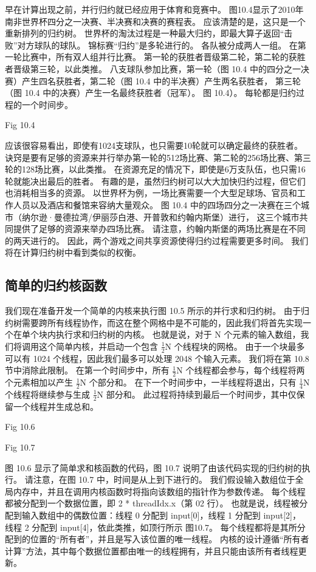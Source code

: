 \begin{remark}[体育和比赛并行约化]
早在计算出现之前，并行归约就已经应用于体育和竞赛中。 图10.4显示了2010年南非世界杯四分之一决赛、半决赛和决赛的赛程表。 
应该清楚的是，这只是一个重新排列的归约树。 世界杯的淘汰过程是一种最大归约，即最大算子返回“击败”对方球队的球队。 
锦标赛“归约”是多轮进行的。 各队被分成两人一组。 在第一轮比赛中，所有双人组并行比赛。 
第一轮的获胜者晋级第二轮，第二轮的获胜者晋级第三轮，以此类推。 
八支球队参加比赛，第一轮（图 10.4 中的四分之一决赛）产生四名获胜者，第二轮（图 10.4 中的半决赛）产生两名获胜者，
第三轮（图 10.4 中的决赛）产生一名最终获胜者（冠军）。 图 10.4）。 每轮都是归约过程的一个时间步。

{\color{red} Fig 10.4}

应该很容易看出，即使有1024支球队，也只需要10轮就可以确定最终的获胜者。 
诀窍是要有足够的资源来并行举办第一轮的512场比赛、第二轮的256场比赛、第三轮的128场比赛，以此类推。 
在资源充足的情况下，即使是6万支队伍，也只需16轮就能决出最后的胜者。 
有趣的是，虽然归约树可以大大加快归约过程，但它们也消耗相当多的资源。 
以世界杯为例，一场比赛需要一个大型足球场、官员和工作人员以及酒店和餐馆来容纳大量观众。 
图 10.4 中的四场四分之一决赛在三个城市（纳尔逊·曼德拉湾/伊丽莎白港、开普敦和约翰内斯堡）进行，
这三个城市共同提供了足够的资源来举办四场比赛。 请注意，约翰内斯堡的两场比赛是在不同的两天进行的。 
因此，两个游戏之间共享资源使得归约过程需要更多时间。 我们将在计算归约树中看到类似的权衡。
\end{remark}

\subsection{简单的归约核函数}
我们现在准备开发一个简单的内核来执行图 10.5 所示的并行求和归约树。 
由于归约树需要跨所有线程协作，而这在整个网格中是不可能的，因此我们将首先实现一个在单个块内执行求和归约树的内核。 
也就是说，对于 N 个元素的输入数组，我们将调用这个简单内核，并启动一个包含 $\frac{1}{2}$N 个线程块的网格。 
由于一个块最多可以有 1024 个线程，因此我们最多可以处理 2048 个输入元素。 我们将在第 10.8 节中消除此限制。 
在第一个时间步中，所有 $\frac{1}{2}$N 个线程都会参与，每个线程将两个元素相加以产生 $\frac{1}{2}$N 个部分和。 
在下一个时间步中，一半线程将退出，只有 $\frac{1}{4}$N 个线程将继续参与生成 $\frac{1}{2}$N 部分和。 
此过程将持续到最后一个时间步，其中仅保留一个线程并生成总和。

{\color{red} Fig 10.6}

{\color{red} Fig 10.7}

图 10.6 显示了简单求和核函数的代码，图 10.7 说明了由该代码实现的归约树的执行。 
请注意，在图 10.7 中，时间是从上到下进行的。 
我们假设输入数组位于全局内存中，并且在调用内核函数时将指向该数组的指针作为参数传递。 
每个线程都被分配到一个数据位置，即 2 * threadIdx.x（第 02 行）。 
也就是说，线程被分配到输入数组中的偶数位置：线程 0 分配到 input[0]，线程 1 分配到 input[2]，
线程 2 分配到 input[4]，依此类推，如顶行所示 图10.7。 
每个线程都将是其所分配到的位置的“所有者”，并且是写入该位置的唯一线程。 
内核的设计遵循“所有者计算”方法，其中每个数据位置都由唯一的线程拥有，并且只能由该所有者线程更新。

